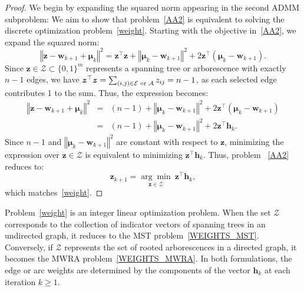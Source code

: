 \documentclass[11pt,a4paper]{article}
\theoremstyle{plain}
\theoremstyle{definition}
\theoremstyle{remark}
\begin{document}
	\begin{proof}
		\label{Proof_prop} We begin by expanding the squared norm appearing in the
		second ADMM subproblem: We aim to show that problem~\eqref{AA2} is
		equivalent to solving the discrete optimization problem~\eqref{weight}.
		Starting with the objective in~\eqref{AA2}, we expand the squared norm: 
		\begin{equation*}
			\left\Vert \boldsymbol{z}-\boldsymbol{w}_{k+1}+\boldsymbol{\mu }%
			_{k}\right\Vert ^{2}=\boldsymbol{z}^{\top }\boldsymbol{z}+\left\Vert 
			\boldsymbol{\mu }_{k}-\boldsymbol{w}_{k+1}\right\Vert ^{2}+2\boldsymbol{z}%
			^{\top }\left( \boldsymbol{\mu }_{k}-\boldsymbol{w}_{k+1}\right) .
		\end{equation*}%
		Since $\boldsymbol{z}\in \mathcal{Z}\subset \{0,1\}^{m}$ represents a
		spanning tree or arborescence with exactly $n-1$ edges, we have $\boldsymbol{%
			z}^{\top }\boldsymbol{z}=\sum_{(i,j)\in \mathcal{E}\text{ or }\mathcal{A}%
		}z_{ij}=n-1$, as each selected edge contributes 1 to the sum. Thus, the
		expression becomes: 
		\begin{eqnarray*}
			\left\Vert \boldsymbol{z}-\boldsymbol{w}_{k+1}+\boldsymbol{\mu }%
			_{k}\right\Vert ^{2} &=&(n-1)+\left\Vert \boldsymbol{\mu }_{k}-\boldsymbol{w}%
			_{k+1}\right\Vert ^{2}+2\boldsymbol{z}^{\top }\left( \boldsymbol{\mu }_{k}-%
			\boldsymbol{w}_{k+1}\right)  \\
			&=&(n-1)+\left\Vert \boldsymbol{\mu }_{k}-\boldsymbol{w}_{k+1}\right\Vert
			^{2}+2\boldsymbol{z}^{\top }\boldsymbol{h}_{k}.
		\end{eqnarray*}%
		Since $n-1$ and $\left\Vert \boldsymbol{\mu }_{k}-\boldsymbol{w}%
		_{k+1}\right\Vert ^{2}$ are constant with respect to $\boldsymbol{z}$,
		minimizing the expression over $\boldsymbol{z}\in \mathcal{Z}$ is equivalent
		to minimizing $\boldsymbol{z}^{\top }\boldsymbol{h}_{k}$. Thus, problem~%
		\eqref{AA2} reduces to: 
		\begin{equation*}
			\boldsymbol{z}_{k+1}=\underset{\boldsymbol{z}\in \mathcal{Z}}{\arg \min }\ 
			\boldsymbol{z}^{\top }\boldsymbol{h}_{k},
		\end{equation*}%
		which matches~\eqref{weight}.
	\end{proof}
	
	
	
	
	Problem~\eqref{weight} is an integer linear optimization problem. When the set $\mathcal{Z}$ corresponds to the collection of indicator vectors of spanning trees in an undirected graph, it reduces to the MST problem~\eqref{WEIGHTS_MST}. Conversely, if $\mathcal{Z}$ represents the set of rooted arborescences in a directed graph, it becomes the MWRA problem~\eqref{WEIGHTS_MWRA}. In both formulations, the edge or arc weights are determined by the components of the vector $\boldsymbol{h}_k$ at each iteration $k \geq 1$.
	
\end{document}
